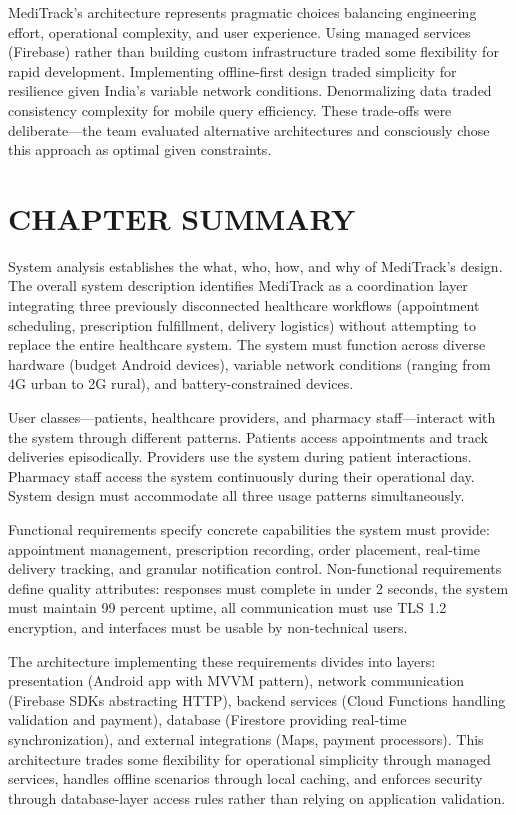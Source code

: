 \documentclass[12pt,a4paper]{report}
\begin{document}
MediTrack's architecture represents pragmatic choices balancing engineering effort, operational complexity, and user experience. Using managed services (Firebase) rather than building custom infrastructure traded some flexibility for rapid development. Implementing offline-first design traded simplicity for resilience given India's variable network conditions. Denormalizing data traded consistency complexity for mobile query efficiency. These trade-offs were deliberate—the team evaluated alternative architectures and consciously chose this approach as optimal given constraints.

\section*{CHAPTER SUMMARY}

System analysis establishes the what, who, how, and why of MediTrack's design. The overall system description identifies MediTrack as a coordination layer integrating three previously disconnected healthcare workflows (appointment scheduling, prescription fulfillment, delivery logistics) without attempting to replace the entire healthcare system. The system must function across diverse hardware (budget Android devices), variable network conditions (ranging from 4G urban to 2G rural), and battery-constrained devices.

User classes—patients, healthcare providers, and pharmacy staff—interact with the system through different patterns. Patients access appointments and track deliveries episodically. Providers use the system during patient interactions. Pharmacy staff access the system continuously during their operational day. System design must accommodate all three usage patterns simultaneously.

Functional requirements specify concrete capabilities the system must provide: appointment management, prescription recording, order placement, real-time delivery tracking, and granular notification control. Non-functional requirements define quality attributes: responses must complete in under 2 seconds, the system must maintain 99 percent uptime, all communication must use TLS 1.2 encryption, and interfaces must be usable by non-technical users.

The architecture implementing these requirements divides into layers: presentation (Android app with MVVM pattern), network communication (Firebase SDKs abstracting HTTP), backend services (Cloud Functions handling validation and payment), database (Firestore providing real-time synchronization), and external integrations (Maps, payment processors). This architecture trades some flexibility for operational simplicity through managed services, handles offline scenarios through local caching, and enforces security through database-layer access rules rather than relying on application validation.
\end{document}
